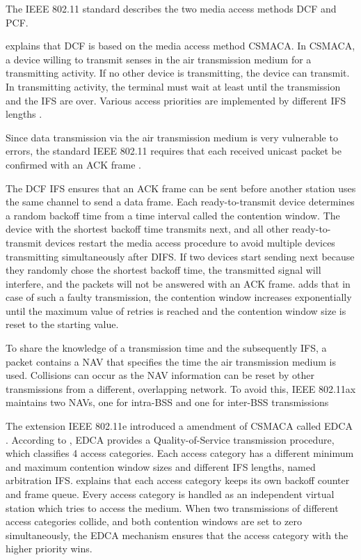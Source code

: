 The IEEE 802.11 standard describes the two media access methods \ac{DCF} and \ac{PCF}.

\textcite{sauter_wireless_2022} explains that \ac{DCF} is based on the media access method \ac{CSMACA}.
In \ac{CSMACA}, a device willing to transmit senses in the air transmission medium for a transmitting activity.
If no other device is transmitting, the device can transmit.
In transmitting activity, the terminal must wait at least until the transmission and the \ac{IFS} are over.
Various access priorities are implemented by different \ac{IFS} lengths \cite{sommer_vehicular_2014}.

Since data transmission via the air transmission medium is very vulnerable to errors,
the standard IEEE 802.11 requires that each received unicast packet be confirmed with an \ac{ACK} frame \cite{sommer_vehicular_2014}.

The \ac{DCF} \ac{IFS} ensures that an \ac{ACK} frame can be sent before another station uses the same channel to send a data frame.
Each ready-to-transmit device determines
a random backoff time from a time interval called the contention window.
The device with the shortest backoff time transmits next, and all other ready-to-transmit devices restart the media access procedure to avoid multiple devices transmitting simultaneously after \ac{DIFS}.
If two devices start sending next because they randomly chose the shortest backoff time,
the transmitted signal will interfere, and the packets will not be answered with an \ac{ACK} frame.
\textcite{sommer_vehicular_2014} adds that in case of such a faulty transmission, the contention window increases exponentially until the maximum value of retries is reached and
the contention window size is reset to the starting value.

To share the knowledge of a transmission time and the subsequently \ac{IFS}, a packet contains a \ac{NAV} that
specifies the time the air transmission medium is used.
Collisions can occur as the \ac{NAV} information can be reset by other transmissions from a different, overlapping network.
To avoid this, IEEE 802.11ax maintains two \ac{NAV}s, one for intra-\ac{BSS} and one for inter-\ac{BSS} transmissions \cite{noauthor_ieee_2021}

The extension IEEE 802.11e introduced a amendment of \ac{CSMACA} called \ac{EDCA} \cite{sommer_vehicular_2014} \cite{wu_ieee_2006}.
According to \textcite{sommer_vehicular_2014}, \ac{EDCA} provides a Quality-of-Service transmission procedure, which classifies \num{4} access categories.
Each access category has a different minimum and maximum contention window sizes and different \ac{IFS} lengths, named
arbitration \ac{IFS}.
\textcite{wu_ieee_2006} explains that each access category keeps its own backoff counter and frame queue.
Every access category is handled as an independent virtual station which tries to access the medium.
When two transmissions of different access categories collide, and both contention windows are set to zero simultaneously, the \ac{EDCA} mechanism ensures that the access category with the higher priority wins.

